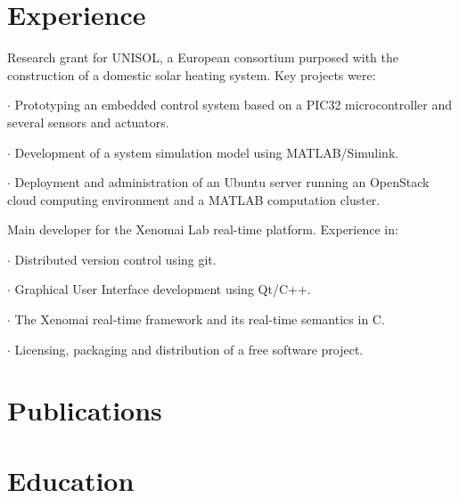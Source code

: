 \section*{Experience}

{
Research grant for UNISOL, a European consortium purposed with the construction
of a domestic solar heating system. Key projects were:

 $\cdot$  Prototyping an embedded control system based on a PIC32 microcontroller and
several sensors and actuators.

 $\cdot$  Development of a system simulation model using MATLAB/Simulink.

 $\cdot$  Deployment and administration of an Ubuntu server running an
OpenStack cloud computing environment and a MATLAB computation cluster.
}

{
Main developer for the Xenomai Lab real-time platform. Experience in:

 $\cdot$ Distributed version control using git.

 $\cdot$ Graphical User Interface development using Qt/C++.

 $\cdot$ The Xenomai real-time framework and its real-time semantics in C.

 $\cdot$ Licensing, packaging and distribution of a free software project.

}

\section*{Publications}


\section*{Education}

